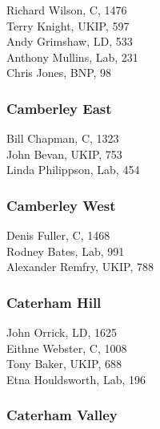 \documentclass[a4paper,openany,10pt]{book}
\begin{document}


Richard Wilson, C, 1476\\
Terry Knight, UKIP, 597\\
Andy Grimshaw, LD, 533\\
Anthony Mullins, Lab, 231\\
Chris Jones, BNP, 98\\


\subsubsection*{Camberley East}



Bill Chapman, C, 1323\\
John Bevan, UKIP, 753\\
Linda Philippson, Lab, 454\\


\subsubsection*{Camberley West}



Denis Fuller, C, 1468\\
Rodney Bates, Lab, 991\\
Alexander Remfry, UKIP, 788\\


\subsubsection*{Caterham Hill}



John Orrick, LD, 1625\\
Eithne Webster, C, 1008\\
Tony Baker, UKIP, 688\\
Etna Houldsworth, Lab, 196\\


\subsubsection*{Caterham Valley}

\end{document}
